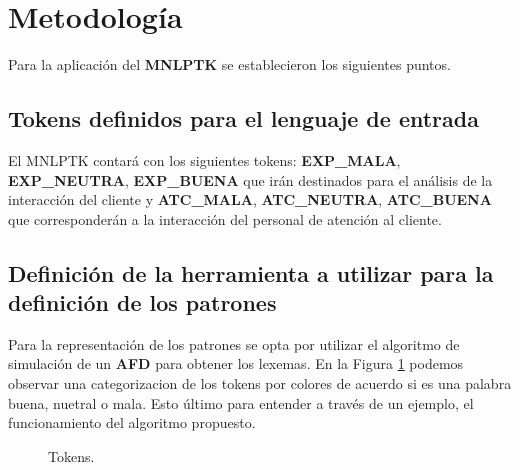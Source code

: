 \documentclass[10pt,times,twocolumn]{article}
\begin{document}
\section{Metodología}
Para la aplicación del \textbf{MNLPTK} se establecieron los siguientes puntos.

\subsection{Tokens definidos para el lenguaje de entrada}
El MNLPTK contará con los siguientes tokens: \textbf{EXP\_MALA}, \textbf{EXP\_NEUTRA}, \textbf{EXP\_BUENA} que irán destinados para el análisis de la interacción del cliente y \textbf{ATC\_MALA}, \textbf{ATC\_NEUTRA}, \textbf{ATC\_BUENA} que corresponderán a la interacción del personal de atención al cliente.

\subsection{Definición de la herramienta a utilizar para la definición de los patrones}
Para la representación de los patrones se opta por utilizar el algoritmo de simulación de un \textbf{AFD} \cite{compi2008} para obtener los lexemas. En la Figura \ref{fig:tokens} podemos observar una categorizacion de los tokens por colores de acuerdo si es una palabra buena, nuetral o mala. Esto último para entender a través de un ejemplo, el funcionamiento del algoritmo propuesto. 

\setcounter{i}{0}


\begin{figure}[H]
  \centering
	\caption{Tokens.}
	\label{fig:tokens}
\end{figure}
\end{document}
